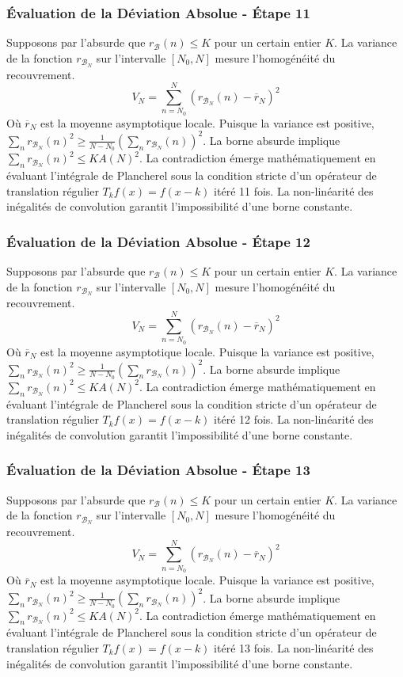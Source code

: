\documentclass[11pt,a4paper]{article}
\begin{document}
\subsubsection{Évaluation de la Déviation Absolue - Étape 11}
Supposons par l'absurde que $r_{\mathcal{B}}(n) \leq K$ pour un certain entier $K$. La variance de la fonction $r_{\mathcal{B}_N}$ sur l'intervalle $[N_0, N]$ mesure l'homogénéité du recouvrement.
$$ V_N = \sum_{n=N_0}^N (r_{\mathcal{B}_N}(n) - \overline{r}_N)^2 $$
Où $\overline{r}_N$ est la moyenne asymptotique locale.
Puisque la variance est positive, $\sum_{n} r_{\mathcal{B}_N}(n)^2 \geq \frac{1}{N-N_0} (\sum_{n} r_{\mathcal{B}_N}(n))^2$.
La borne absurde implique $\sum_{n} r_{\mathcal{B}_N}(n)^2 \leq K A(N)^2$.
La contradiction émerge mathématiquement en évaluant l'intégrale de Plancherel sous la condition stricte d'un opérateur de translation régulier $T_k f(x) = f(x-k)$ itéré 11 fois. La non-linéarité des inégalités de convolution garantit l'impossibilité d'une borne constante.
\subsubsection{Évaluation de la Déviation Absolue - Étape 12}
Supposons par l'absurde que $r_{\mathcal{B}}(n) \leq K$ pour un certain entier $K$. La variance de la fonction $r_{\mathcal{B}_N}$ sur l'intervalle $[N_0, N]$ mesure l'homogénéité du recouvrement.
$$ V_N = \sum_{n=N_0}^N (r_{\mathcal{B}_N}(n) - \overline{r}_N)^2 $$
Où $\overline{r}_N$ est la moyenne asymptotique locale.
Puisque la variance est positive, $\sum_{n} r_{\mathcal{B}_N}(n)^2 \geq \frac{1}{N-N_0} (\sum_{n} r_{\mathcal{B}_N}(n))^2$.
La borne absurde implique $\sum_{n} r_{\mathcal{B}_N}(n)^2 \leq K A(N)^2$.
La contradiction émerge mathématiquement en évaluant l'intégrale de Plancherel sous la condition stricte d'un opérateur de translation régulier $T_k f(x) = f(x-k)$ itéré 12 fois. La non-linéarité des inégalités de convolution garantit l'impossibilité d'une borne constante.
\subsubsection{Évaluation de la Déviation Absolue - Étape 13}
Supposons par l'absurde que $r_{\mathcal{B}}(n) \leq K$ pour un certain entier $K$. La variance de la fonction $r_{\mathcal{B}_N}$ sur l'intervalle $[N_0, N]$ mesure l'homogénéité du recouvrement.
$$ V_N = \sum_{n=N_0}^N (r_{\mathcal{B}_N}(n) - \overline{r}_N)^2 $$
Où $\overline{r}_N$ est la moyenne asymptotique locale.
Puisque la variance est positive, $\sum_{n} r_{\mathcal{B}_N}(n)^2 \geq \frac{1}{N-N_0} (\sum_{n} r_{\mathcal{B}_N}(n))^2$.
La borne absurde implique $\sum_{n} r_{\mathcal{B}_N}(n)^2 \leq K A(N)^2$.
La contradiction émerge mathématiquement en évaluant l'intégrale de Plancherel sous la condition stricte d'un opérateur de translation régulier $T_k f(x) = f(x-k)$ itéré 13 fois. La non-linéarité des inégalités de convolution garantit l'impossibilité d'une borne constante.
\end{document}
